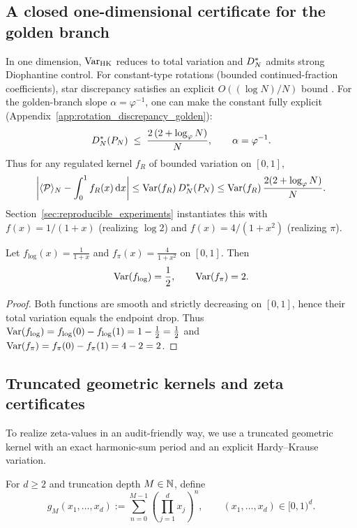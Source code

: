 \subsection{A closed one-dimensional certificate for the golden branch}
\label{sec:golden_branch}

In one dimension, $\mathrm{Var}_{\mathrm{HK}}$ reduces to total variation and $D_N^\ast$ admits strong Diophantine control.
For constant-type rotations (bounded continued-fraction coefficients), star discrepancy satisfies an explicit $O((\log N)/N)$ bound \cite{KuipersNiederreiter1974,DrmotaTichy1997}.
For the golden-branch slope $\alpha=\varphi^{-1}$, one can make the constant fully explicit (Appendix~\ref{app:rotation_discrepancy_golden}):
\begin{equation}
\label{eq:golden_discrepancy_bound}
D_N^\ast(P_N)\;\le\;\frac{2\,(2+\log_\varphi N)}{N},
\qquad \alpha=\varphi^{-1}.
\end{equation}
Thus for any regulated kernel $f_R$ of bounded variation on $[0,1]$,
\[
\left|\langle \mathcal{P} \rangle_N-\int_0^1 f_R(x)\,\mathrm{d} x\right|
\le \mathrm{Var}(f_R)\,D_N^\ast(P_N)
\le \mathrm{Var}(f_R)\,\frac{2(2+\log_\varphi N)}{N}.
\]
Section~\ref{sec:reproducible_experiments} instantiates this with $f(x)=1/(1+x)$ (realizing $\log 2$) and $f(x)=4/(1+x^2)$ (realizing $\pi$).

\begin{proposition}
\label{prop:variations_log_pi}
Let $f_{\log}(x)=\frac{1}{1+x}$ and $f_{\pi}(x)=\frac{4}{1+x^2}$ on $[0,1]$.
Then
\[
\mathrm{Var}(f_{\log})=\frac{1}{2},
\qquad
\mathrm{Var}(f_{\pi})=2.
\]
\end{proposition}

\begin{proof}
Both functions are smooth and strictly decreasing on $[0,1]$, hence their total variation equals the endpoint drop.
Thus $\mathrm{Var}(f_{\log})=f_{\log}(0)-f_{\log}(1)=1-\frac12=\frac12$ and $\mathrm{Var}(f_{\pi})=f_{\pi}(0)-f_{\pi}(1)=4-2=2$.
\end{proof}

\subsection{Truncated geometric kernels and zeta certificates}
\label{sec:truncated_geometric}

To realize zeta-values in an audit-friendly way, we use a truncated geometric kernel with an exact harmonic-sum period and an explicit Hardy--Krause variation.

\begin{definition}
\label{def:geom_kernel}
For $d\ge 2$ and truncation depth $M\in\mathbb{N}$, define
\[
g_M(x_1,\dots,x_d)
 := \sum_{n=0}^{M-1}\left(\prod_{j=1}^d x_j\right)^n,
\qquad (x_1,\dots,x_d)\in[0,1)^d.
\]
\end{definition}

